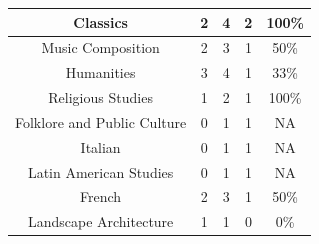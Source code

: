 \documentclass[10]{article}
\begin{document}
\begin{longtable}[c]{|ccccc|}
	\multicolumn{1}{|c|}{Classics}                                   & \multicolumn{1}{c|}{2}                               & \multicolumn{1}{c|}{4}                                   & \multicolumn{1}{c|}{2}                  & 100\%                 \\ \hline
	\multicolumn{1}{|c|}{Music Composition}                          & \multicolumn{1}{c|}{2}                               & \multicolumn{1}{c|}{3}                                   & \multicolumn{1}{c|}{1}                  & 50\%                  \\ \hline
	\multicolumn{1}{|c|}{Humanities}                                 & \multicolumn{1}{c|}{3}                               & \multicolumn{1}{c|}{4}                                   & \multicolumn{1}{c|}{1}                  & 33\%                  \\ \hline
	\multicolumn{1}{|c|}{Religious Studies}                          & \multicolumn{1}{c|}{1}                               & \multicolumn{1}{c|}{2}                                   & \multicolumn{1}{c|}{1}                  & 100\%                 \\ \hline
	\multicolumn{1}{|c|}{Folklore and Public Culture}                & \multicolumn{1}{c|}{0}                               & \multicolumn{1}{c|}{1}                                   & \multicolumn{1}{c|}{1}                  & NA                    \\ \hline
	\multicolumn{1}{|c|}{Italian}                                    & \multicolumn{1}{c|}{0}                               & \multicolumn{1}{c|}{1}                                   & \multicolumn{1}{c|}{1}                  & NA                    \\ \hline
	\multicolumn{1}{|c|}{Latin American Studies}                     & \multicolumn{1}{c|}{0}                               & \multicolumn{1}{c|}{1}                                   & \multicolumn{1}{c|}{1}                  & NA                    \\ \hline
	\multicolumn{1}{|c|}{French}                                     & \multicolumn{1}{c|}{2}                               & \multicolumn{1}{c|}{3}                                   & \multicolumn{1}{c|}{1}                  & 50\%                  \\ \hline
	\multicolumn{1}{|c|}{Landscape Architecture}                     & \multicolumn{1}{c|}{1}                               & \multicolumn{1}{c|}{1}                                   & \multicolumn{1}{c|}{0}                  & 0\%                   \\ \hline

\end{longtable}
\end{document}
